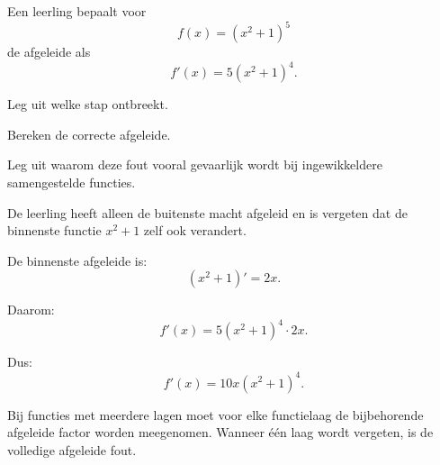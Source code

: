 \documentclass{ximera}
\begin{document}
\begin{oefening}{\oefU\ESS}

Een leerling bepaalt voor
\[f(x)=(x^2+1)^5\]
de afgeleide als
\[f'(x)=5(x^2+1)^4.\]

\begin{question}
Leg uit welke stap ontbreekt.
\end{question}

\begin{question}
Bereken de correcte afgeleide.
\end{question}

\begin{question}
Leg uit waarom deze fout vooral gevaarlijk wordt bij ingewikkeldere
samengestelde functies.
\end{question}

\begin{oplossing}
De leerling heeft alleen de buitenste macht afgeleid en is vergeten
dat de binnenste functie $x^2+1$ zelf ook verandert.

De binnenste afgeleide is:
\[(x^2+1)'=2x.\]

Daarom:
\[
f'(x)
=
5(x^2+1)^4\cdot2x.
\]

Dus:
\[\boxed{f'(x)=10x(x^2+1)^4.}\]

Bij functies met meerdere lagen moet voor elke functielaag de
bijbehorende afgeleide factor worden meegenomen. Wanneer één laag
wordt vergeten, is de volledige afgeleide fout.
\end{oplossing}
\end{oefening}
\end{document}
